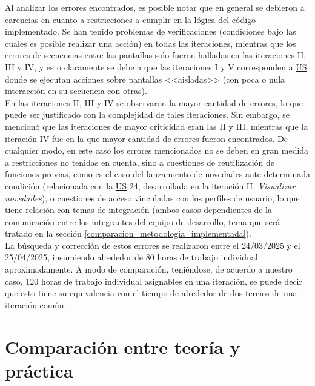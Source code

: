 \documentclass[a4paper, 12pt,twoside]{report}  %
\numberwithin{equation}{subsection} %
\begin{document}
\indent Al analizar los errores encontrados, es posible notar que en general se debieron a carencias en cuanto a restricciones a cumplir en la lógica del código implementado. Se han tenido problemas de verificaciones (condiciones bajo las cuales es posible realizar una acción) en todas las iteraciones, mientras que los errores de secuencias entre las pantallas solo fueron halladas en las iteraciones II, III y IV, y esto claramente se debe a que las iteraciones I y V corresponden a \hyperlink{US}{US} donde se ejecutan acciones sobre pantallas <<aisladas>> (con poca o nula interacción en su secuencia con otras).\\
\indent En las iteraciones II, III y IV se observaron la mayor cantidad de errores, lo que puede ser justificado con la complejidad de tales iteraciones. Sin embargo, se mencionó que las iteraciones de mayor criticidad eran las II y III, mientras que la iteración IV fue en la que mayor cantidad de errores fueron encontrados. De cualquier modo, en este caso los errores mencionados no se deben en gran medida a restricciones no tenidas en cuenta, sino a cuestiones de reutilización de funciones previas, como es el caso del lanzamiento de novedades ante determinada condición (relacionada con la \hyperlink{US}{US} 24, desarrollada en la iteración II, \textit{Visualizar novedades}), o cuestiones de acceso vinculadas con los perfiles de usuario, lo que tiene relación con temas de integración (ambos casos dependientes de la comunicación entre los integrantes del equipo de desarrollo, tema que será tratado en la sección \ref{comparacion_metodologia_implementada}).\\
\indent La búsqueda y corrección de estos errores se realizaron entre el 24/03/2025 y el 25/04/2025, insumiendo alrededor de 80 horas de trabajo individual aproximadamente. A modo de comparación, teniéndose, de acuerdo a nuestro caso, 120 horas de trabajo individual asignables en una iteración, se puede decir que esto tiene su equivalencia con el tiempo de alrededor de dos tercios de una iteración común.


\chapter{Comparación entre teoría y práctica}
\end{document}
